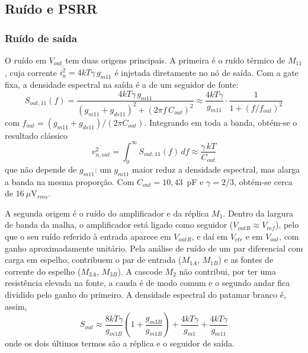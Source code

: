 \subsection{Ruído e PSRR}
\label{subsec:ruido_psrr}

\subsubsection{Ruído de saída}

O ruído em $V_{out}$ tem duas origens principais. A primeira é o ruído térmico de $M_{11}$, cuja corrente
$\overline{i_n^2} = 4kT\gamma\,g_{m11}$ é injetada diretamente no nó de saída. Com a gate fixa, a densidade espectral
na saída é a de um seguidor de fonte:
\begin{equation}
    S_{out,11}(f) = \frac{4kT\gamma\,g_{m11}}{\left(g_{m11} + g_{ds11}\right)^2 + \left(2\pi f\,C_{out}\right)^2}
    \approx \frac{4kT\gamma}{g_{m11}}\cdot\frac{1}{1 + \left(f/f_{out}\right)^2}
\end{equation}
com $f_{out} = (g_{m11}+g_{ds11})/(2\pi C_{out})$. Integrando em toda a banda, obtém-se o resultado clássico
\begin{equation}
    \overline{v_{n,out}^2} = \int_0^\infty S_{out,11}(f)\,df \approx \frac{\gamma\,kT}{C_{out}}
\end{equation}
que não depende de $g_{m11}$: um $g_{m11}$ maior reduz a densidade espectral, mas alarga a banda na mesma proporção.
Com $C_{out} = 10{,}43$~pF e $\gamma = 2/3$, obtém-se cerca de $16~\mu$V$_{rms}$.

A segunda origem é o ruído do amplificador e da réplica $M_1$. Dentro da largura de banda da malha, o amplificador está
ligado como seguidor ($V_{outR} \approx V_{ref}$), pelo que o seu ruído referido à entrada aparece em $V_{outR}$, e daí em
$V_{ctr}$ e em $V_{out}$, com ganho aproximadamente unitário. Pela análise de ruído de um par diferencial com carga em
espelho, contribuem o par de entrada ($M_{1A}$, $M_{1B}$) e as fontes de corrente do espelho ($M_{3A}$, $M_{3B}$). A cascode
$M_2$ não contribui, por ter uma resistência elevada na fonte, a cauda é de modo comum e o segundo andar fica dividido pelo
ganho do primeiro. A densidade espectral do patamar branco é, assim,
\begin{equation}
    S_{out} \approx \frac{8kT\gamma}{g_{m1B}}\left(1 + \frac{g_{m3B}}{g_{m1B}}\right) + \frac{4kT\gamma}{g_{m1}} + \frac{4kT\gamma}{g_{m11}}
    \label{eq:ruido_branco}
\end{equation}
onde os dois últimos termos são a réplica e o seguidor de saída.

